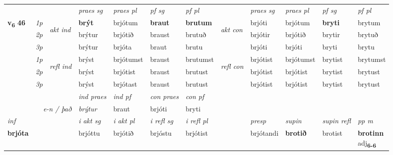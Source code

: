 \begin{longtable}[l]{X>{\footnotesize\itshape}llXXXXlXXXX}
 & &   & \textit{praes sg}  & \textit{praes pl}    & \textit{ pf sg} & \textit{pf pl} & & \textit{praes sg}  & \textit{praes pl}    & \textit{pf sg} & \textit{pf pl }  \\ \cmidrule{4-7} \cmidrule{9-12}
 \multirow{2}{*}{{{\textbf{v{\textsubscript{6}}} \Large{\textbf{46}}}}}  & 1p & \multirow{3}{*}{\begin{turn}{90}\textit{akt ind}\end{turn}} & \textbf{brýt} & brjótum & \textbf{braut} & \textbf{brutum} & \multirow{3}{*}{\begin{turn}{90}\textit{akt con}\end{turn}} &brjóti & brjótum & \textbf{bryti} & brytum\\*
 & 2p &  &  brýtur  & brjótið & braust & brutuð & & brjótir & brjótið & brytir & brytuð \\*
 & 3p &  & brýtur & brjóta & braut & brutu & & brjóti & brjóti& bryti & brytu \\*
\cmidrule{4-7} \cmidrule{9-12}
 & 1p & \multirow{3}{*}{\begin{turn}{90}\textit{refl ind}\end{turn}}  & brýst & brjótumst & braust & brutumst & \multirow{3}{*}{\begin{turn}{90}\textit{refl con}\end{turn}}  &brjótist & brjótumst & brytist & brytumst \\*
 & 2p &  & brýst & brjótist & braust & brutust & &brjótist & brjótist & brytist & brytust \\*
 & 3p  & & brýst & brjótast & braust & brutust & & brjótist & brjótist& brytist & brytust \\*
\cmidrule{4-7} \cmidrule{9-12}

   && &  \textit{ind praes} & \textit{ind pf} & \textit{con praes} & \textit{con pf} \\*
\multicolumn{3}{r}{\textit{e-n / það}} & brýtur & braut & brjóti & bryti \\*

\cmidrule{4-7}
   {\textit{inf}} & &  & \textit{i akt sg} & \textit{i akt pl} & \textit{i refl sg} & \textit{i refl pl} && \textit{presp} & \textit{supin} & \textit{supin refl} & \textit{pp m} \\*
  {\textbf{brjóta}} & && brjóttu  & brjótið & brjóstu & brjótist && brjótandi &  \textbf{brotið} & brotist & \specialcell{\textbf{brotinn} \\ adj\textbf{\textsubscript{6-6}}} \\*


\end{longtable}
